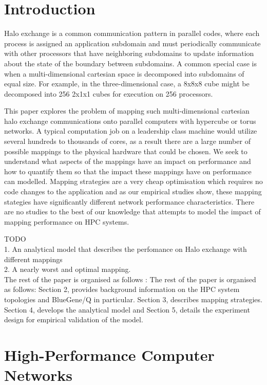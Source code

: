 \documentclass{acm_proc_article-sp}
\begin{document}
\section{Introduction}

Halo exchange is a common communication pattern in parallel codes, where
each process is assigned an application subdomain and must periodically
communicate with other processors that have neighboring subdomains to
update information about the state of the boundary between subdomains.
A common special case is when a multi-dimensional cartesian space is
decomposed into subdomains of equal size.  For example, in the three-dimensional
case, a 8x8x8 cube might be decomposed into 256 2x1x1 cubes for execution on 256 processors.

This paper explores the problem of mapping such multi-dimensional cartesian
halo exchange communications onto parallel computers with hypercube or
torus networks. A typical computation job on a leadership class machine would
utilize several hundreds to thousands of cores, as a result there are a large number of
possible mappings to the physical hardware that could be chosen. We seek to understand
what aspects of the mappings have an impact on performance and how to quantify them so
that the impact these mappings have on performance can modelled. Mapping strategies
are a very cheap optimisation which requires no code changes to the application
and as our empirical studies show, these mapping stategies have significantly
different network performance characteristics. There are no studies to the best
of our knowledge that attempts to model the impact of mapping performance on
HPC systems.

TODO\\
1. An analytical model that describes the perfomance on Halo exchange with different mappings\\
2. A nearly worst and optimal mapping.\\

The rest of the paper is organised as follows :
The rest of the paper is organised as follows: Section 2, provides background information on
the HPC system topologies and BlueGene/Q in particular. Section 3, describes mapping strategies.
Section 4, develops the analytical model and Section 5, details the experiment design for empirical
validation of the model.


\section{High-Performance Computer Networks}
\end{document}
